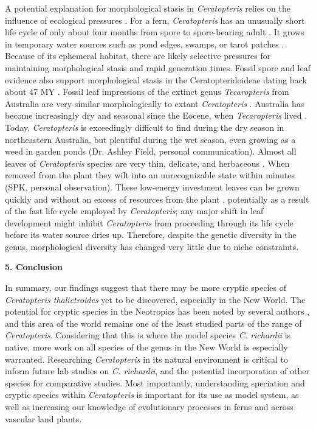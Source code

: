\documentclass[12pt]{article}
\begin{document}
\begin{flushleft}
A potential explanation for morphological stasis in \textit{Ceratopteris} relies on the influence of ecological pressures \autocite{Bickford2007}. For a fern, \textit{Ceratopteris} has an unusually short life cycle of only about four months from spore to spore-bearing adult \autocite{Stein1971}. It grows in temporary water sources such as pond edges, swamps, or tarot patches \autocite{LloydTax1974}. Because of its ephemeral habitat, there are likely selective pressures for maintaining morphological stasis and rapid generation times. Fossil spore and leaf evidence also support morphological stasis in the Ceratopteridoideae dating back about 47 MY \autocite{Dettmann1992, Rozefelds2016-dr}. Fossil leaf impressions of the extinct genus \textit{Tecaropteris} from Australia are very similar morphologically to extant \textit{Ceratopteris} \autocite{Rozefelds2016-dr}. Australia has become increasingly dry and seasonal since the Eocene, when \textit{Tecaropteris} lived \autocite{Rozefelds2016-dr, McKenna2010}. Today, \textit{Ceratopteris} is exceedingly difficult to find during the dry season in northeastern Australia, but plentiful during the wet season, even growing as a weed in garden ponds (Dr. Ashley Field, personal communication). Almost all leaves of \textit{Ceratopteris} species are very thin, delicate, and herbaceous \autocite{LloydTax1974}. When removed from the plant they wilt into an unrecognizable state within minutes (SPK, personal observation). These low-energy investment leaves can be grown quickly and without an excess of resources from the plant \autocite{Reich2014, Wright2004}, potentially as a result of the fast life cycle employed by \textit{Ceratopteris}; any major shift in leaf development might inhibit \textit{Ceratopteris} from proceeding through its life cycle before its water source dries up. Therefore, despite the genetic diversity in the genus, morphological diversity has changed very little due to niche constraints. 

\vspace{1cm}

{\large\textbf{5. Conclusion}}

In summary, our findings suggest that there may be more cryptic species of \textit{Ceratopteris thalictroides} yet to be discovered, especially in the New World. The potential for cryptic species in the Neotropics has been noted by several authors \autocite{Masuyama2010, LloydTax1974}, and this area of the world remains one of the least studied parts of the range of \textit{Ceratopteris}. Considering that this is where the model species \textit{C. richardii} is native, more work on all species of the genus in the New World is especially warranted. Researching \textit{Ceratopteris} in its natural environment is critical to inform future lab studies on \textit{C. richardii}, and the potential incorporation of other species for comparative studies. Most importantly, understanding speciation and cryptic species within \textit{Ceratopteris} is important for its use as model system, as well as increasing our knowledge of evolutionary processes in ferns and across vascular land plants.


\end{flushleft}
\end{document}
